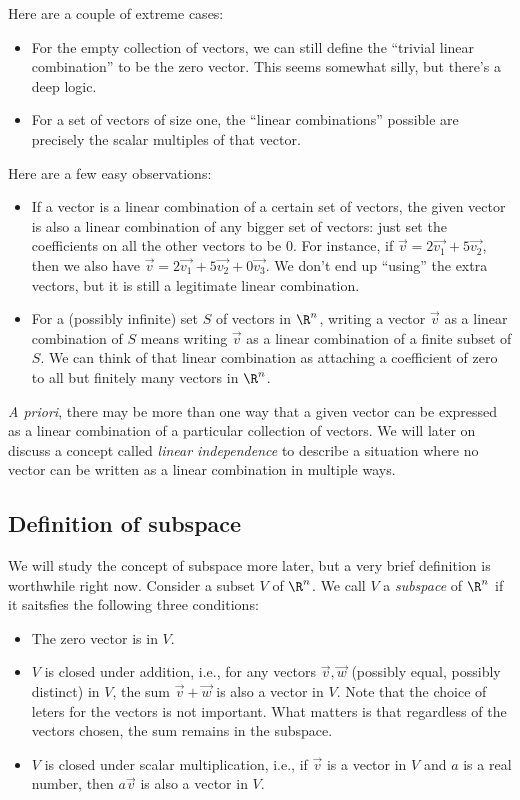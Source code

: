 \documentclass[10pt]{amsart}
\begin{document}
Here are a couple of extreme cases:

\begin{itemize}
\item For the empty collection of vectors, we can still define the
  ``trivial linear combination'' to be the zero vector. This seems
  somewhat silly, but there's a deep logic.
\item For a set of vectors of size one, the ``linear combinations''
  possible are precisely the scalar multiples of that vector.
\end{itemize}

Here are a few easy observations:

\begin{itemize}
\item If a vector is a linear combination of a certain set of vectors,
  the given vector is also a linear combination of any bigger set of
  vectors: just set the coefficients on all the other vectors to be
  $0$. For instance, if $\vec{v} = 2\vec{v_1} + 5\vec{v_2}$, then we
  also have $\vec{v} = 2\vec{v_1} + 5\vec{v_2} + 0\vec{v_3}$. We don't
  end up ``using'' the extra vectors, but it is still a legitimate
  linear combination.
\item For a (possibly infinite) set $S$ of vectors in $\R^n$, writing
  a vector $\vec{v}$ as a linear combination of $S$ means writing
  $\vec{v}$ as a linear combination of a finite subset of $S$. We can
  think of that linear combination as attaching a coefficient of zero
  to all but finitely many vectors in $\R^n$.
\end{itemize}

{\em A priori}, there may be more than one way that a given
vector can be expressed as a linear combination of a particular
collection of vectors. We will later on discuss a concept called
{\em linear independence} to describe a situation where no vector
can be written as a linear combination in multiple ways.

\subsection{Definition of subspace}

We will study the concept of subspace more later, but a very brief
definition is worthwhile right now. Consider a subset $V$ of
$\R^n$. We call $V$ a {\em subspace} of $\R^n$ if it saitsfies the
following three conditions:

\begin{itemize}
\item The zero vector is in $V$.
\item $V$ is closed under addition, i.e., for any vectors $\vec{v},
  \vec{w}$ (possibly equal, possibly distinct) in $V$, the sum
  $\vec{v} + \vec{w}$ is also a vector in $V$. Note that the choice of
  leters for the vectors is not important. What matters is that
  regardless of the vectors chosen, the sum remains in the subspace.
\item $V$ is closed under scalar multiplication, i.e., if $\vec{v}$ is
  a vector in $V$ and $a$ is a real number, then $a\vec{v}$ is also a
  vector in $V$.
\end{itemize}
\end{document}
